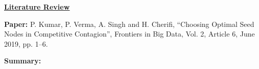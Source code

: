 \documentclass[11pt]{article}
\begin{document}
\newtheorem{theorem}{Theorem}[section]
\newtheorem{lemma}{Lemma}[section]
\newtheorem{corollary}{Corollary}[section]
\newtheorem{fact}{Fact}[section]
\newtheorem{definition}{Definition}[section]
\newtheorem{proposition}{Proposition}[section]
\newtheorem{observation}{Observation}[section]
\newtheorem{claim}{Claim}[section]

\newcommand{\cnp}{\textbf{NP}}
\newcommand{\true}{\texttt{True}}
\newcommand{\false}{\texttt{False}}

\newcommand{\QED}{\hfill\rule{2mm}{2mm}}

\newcommand{\irange}{\mbox{$1 \leq i \leq n$}}
\newcommand{\jrange}{\mbox{$1 \leq j \leq m$}}

\newcommand{\dunder}[1]{\underline{\underline{#1}}}

\setlength{\parskip}{3pt}

\normalbaselineskip

\begin{center}
\dunder{\Large{\textbf{Literature Review}}}
\end{center}

\medskip

\noindent
\textbf{Paper:}  P. Kumar, P. Verma, A. Singh and H. Cherifi,
``Choosing Optimal Seed Nodes in Competitive Contagion”, Frontiers
in Big Data, Vol. 2, Article 6, June 2019, pp. 1--6.

\medskip

\noindent
\textbf{Summary:}
\end{document}
